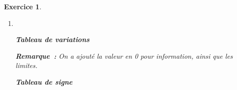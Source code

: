 \documentclass[10pt]{article}
\newtheorem{exo}{Exercice}
\begin{document}
\begin{exo}
\begin{enumerate}
\item ~{}

\setlength{\columnseprule}{1pt}


\begin{multicols}{2}

\begin{center}

\textbf{Tableau de variations}

\end{center}

\medskip

\begin{center}
\end{center}

\medskip

\textbf{Remarque~:} On a ajouté la valeur en 0 pour information, ainsi que les limites.

\columnbreak

\begin{center}

\textbf{Tableau de signe}

\end{center}

\medskip

\begin{center}
\end{center}

\end{multicols}
\end{enumerate}

\end{exo}
\end{document}
